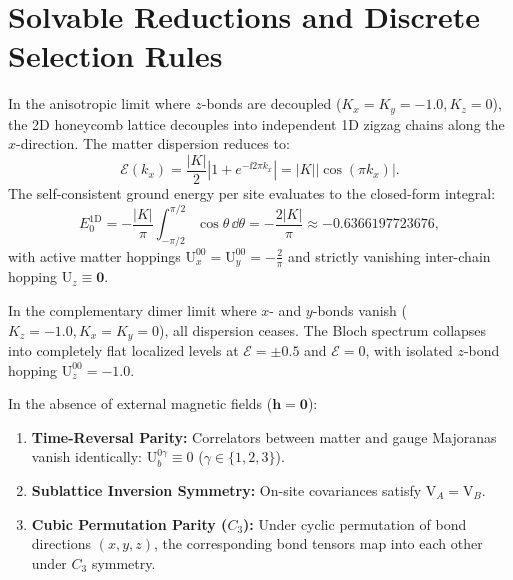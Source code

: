 


\section{Solvable Reductions and Discrete Selection Rules}
\label{sec:m1_4_5_solvable_reductions}

\begin{theorem}
\label{thm:m1_4_5_1d_zigzag}
In the anisotropic limit where $z$-bonds are decoupled ($K_x = K_y = -1.0, K_z = 0$), the 2D honeycomb lattice decouples into independent 1D zigzag chains along the $x$-direction. The matter dispersion reduces to:
\begin{equation}
\label{eq:m1_4_5_zigzag_dispersion}
\mathcal{E}(k_x) = \frac{|K|}{2} |1 + e^{-\ii 2\pi k_x}| = |K| |\cos(\pi k_x)|.
\end{equation}
The self-consistent ground energy per site evaluates to the closed-form integral:
\begin{equation}
\label{eq:m1_4_5_zigzag_energy}
E_0^{\mathrm{1D}} = -\frac{|K|}{\pi} \int_{-\pi/2}^{\pi/2} \cos\theta \, \dd\theta = -\frac{2|K|}{\pi} \approx -0.6366197723676,
\end{equation}
with active matter hoppings $\mathrm{U}_x^{00} = \mathrm{U}_y^{00} = -\frac{2}{\pi}$ and strictly vanishing inter-chain hopping $\mathrm{U}_z \equiv \mathbf{0}$.
\end{theorem}

\begin{proposition}
\label{prop:m1_4_5_dimer_reduction}
In the complementary dimer limit where $x$- and $y$-bonds vanish ($K_z = -1.0, K_x = K_y = 0$), all dispersion ceases. The Bloch spectrum collapses into completely flat localized levels at $\mathcal{E} = \pm 0.5$ and $\mathcal{E} = 0$, with isolated $z$-bond hopping $\mathrm{U}_z^{00} = -1.0$.
\end{proposition}

\begin{proposition}
\label{prop:m1_4_5_selection_rules}
In the absence of external magnetic fields ($\mathbf{h} = \mathbf{0}$):
\begin{enumerate}
\item \textbf{Time-Reversal Parity:} Correlators between matter and gauge Majoranas vanish identically: $\mathrm{U}_b^{0\gamma} \equiv 0$ ($\gamma \in \{1, 2, 3\}$).
\item \textbf{Sublattice Inversion Symmetry:} On-site covariances satisfy $\mathrm{V}_A = \mathrm{V}_B$.
\item \textbf{Cubic Permutation Parity ($C_3$):} Under cyclic permutation of bond directions $(x, y, z)$, the corresponding bond tensors map into each other under $C_3$ symmetry.
\end{enumerate}
\end{proposition}

